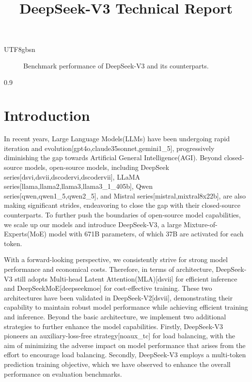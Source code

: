 \documentclass[11pt,a4paper]{article}
\title{DeepSeek-V3 Technical Report}
\begin{document}
\maketitle

UTF8gbsn

\begin{figure}[h]
\caption{Benchmark performance of DeepSeek-V3 and its counterparts.}
\end{figure}

0.9

\section{Introduction}

In recent years, Large Language Models(LLMs) have been undergoing rapid iteration and evolution[gpt4o,claude35sonnet,gemini1\_5], progressively diminishing the gap towards Artificial General Intelligence(AGI). Beyond closed-source models, open-source models, including DeepSeek series[dsvi,dsvii,dscodervi,dscodervii], LLaMA series[llama,llama2,llama3,llama3\_1\_405b], Qwen series[qwen,qwen1\_5,qwen2\_5], and Mistral series[mistral,mixtral8x22b], are also making significant strides, endeavoring to close the gap with their closed-source counterparts. To further push the boundaries of open-source model capabilities, we scale up our models and introduce DeepSeek-V3, a large Mixture-of-Experts(MoE) model with 671B parameters, of which 37B are activated for each token.

With a forward-looking perspective, we consistently strive for strong model performance and economical costs. Therefore, in terms of architecture, DeepSeek-V3 still adopts Multi-head Latent Attention(MLA)[dsvii] for efficient inference and DeepSeekMoE[deepseekmoe] for cost-effective training. These two architectures have been validated in DeepSeek-V2[dsvii], demonstrating their capability to maintain robust model performance while achieving efficient training and inference. Beyond the basic architecture, we implement two additional strategies to further enhance the model capabilities. Firstly, DeepSeek-V3 pioneers an auxiliary-loss-free strategy[noaux\_tc] for load balancing, with the aim of minimizing the adverse impact on model performance that arises from the effort to encourage load balancing. Secondly, DeepSeek-V3 employs a multi-token prediction training objective, which we have observed to enhance the overall performance on evaluation benchmarks.
\end{document}

